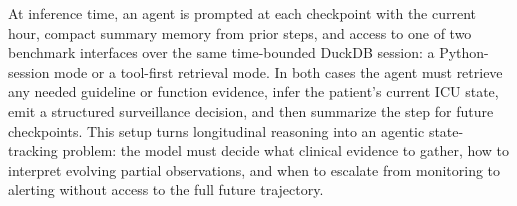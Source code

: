 {At inference time, an agent is prompted at each checkpoint with the current hour, compact summary memory from prior steps, and access to one of two benchmark interfaces over the same time-bounded DuckDB session: a Python-session mode or a tool-first retrieval mode. In both cases the agent must retrieve any needed guideline or function evidence, infer the patient's current ICU state, emit a structured surveillance decision, and then summarize the step for future checkpoints. This setup turns longitudinal reasoning into an agentic state-tracking problem: the model must decide what clinical evidence to gather, how to interpret evolving partial observations, and when to escalate from monitoring to alerting without access to the full future trajectory.
}
